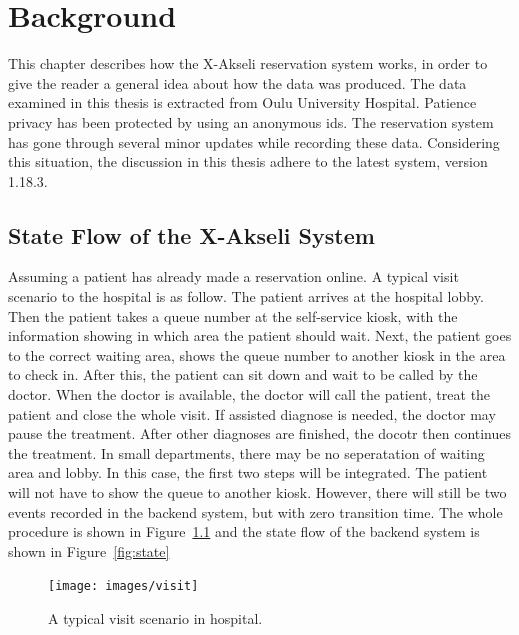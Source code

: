 \chapter{Background}
\label{chapter:background}

This chapter describes how the X-Akseli reservation system works, in order to give the reader a general idea about how the data was produced. The data examined in this thesis is extracted from Oulu University Hospital. Patience privacy has been protected by using an anonymous ids. The reservation system has gone through several minor updates while recording these data. Considering this situation, the discussion in this thesis adhere to the latest system, version 1.18.3.

\section{State Flow of the X-Akseli System}
Assuming a patient has already made a reservation online. A typical visit scenario to the hospital is as follow. The patient arrives at the hospital lobby. Then the patient takes a queue number at the self-service kiosk, with the information showing in which area the patient should wait. Next, the patient goes to the correct waiting area, shows the queue number to another kiosk in the area to check in. After this, the patient can sit down and wait to be called by the doctor. When the doctor is available, the doctor will call the patient, treat the patient and close the whole visit. If assisted diagnose is needed, the doctor may pause the treatment. After other diagnoses are finished, the docotr then continues the treatment. In small departments, there may be no seperatation of waiting area and lobby. In this case, the first two steps will be integrated. The patient will not have to show the queue to another kiosk. However, there will still be two events recorded in the backend system, but with zero transition time. The whole procedure is shown in Figure~\ref{fig:visit} and the state flow of the backend system is shown in Figure~\ref{fig:state}

\begin{figure}
	\begin{center}
		\texttt{[image: images/visit]}
		\caption{A typical visit scenario in hospital.}
		\label{fig:visit}
	\end{center}
\end{figure}

